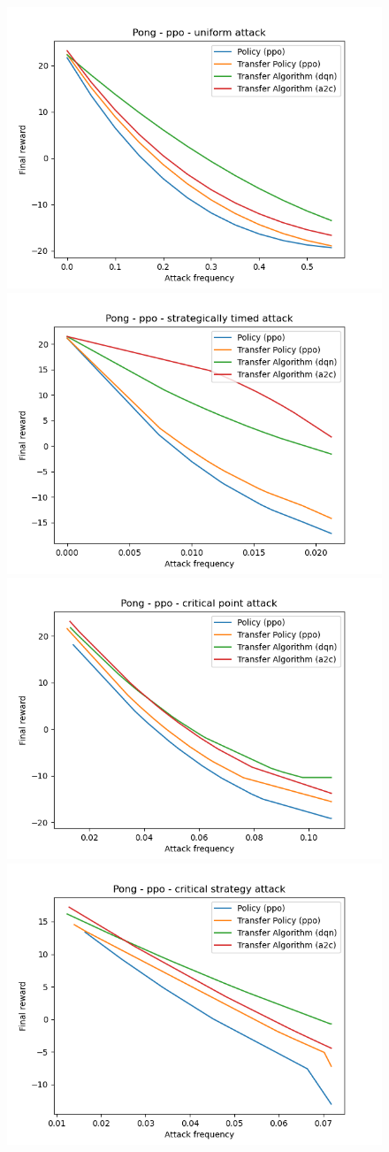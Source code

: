 \begin{figure}
  \centering
    {\includegraphics[width=0.49\linewidth]{images/exp1/ppo-pong-uniform.png}}
    {\includegraphics[width=0.49\linewidth]{images/exp1/ppo-pong-strategically_timed.png}}
    {\includegraphics[width=0.49\linewidth]{images/exp1/ppo-pong-critical_point.png}}
    {\includegraphics[width=0.49\linewidth]{images/exp1/ppo-pong-critical_strategy.png}}

\end{figure}
